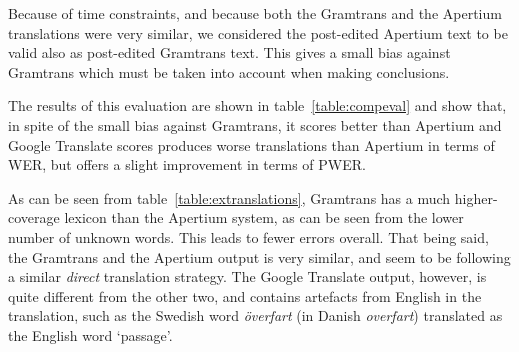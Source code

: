 \documentclass[11pt]{article}
\begin{document}
Because of time constraints, and because both the Gramtrans and the Apertium translations were very similar, 
we considered the post-edited Apertium text to be valid also as post-edited Gramtrans text.
This gives a small bias against Gramtrans which must be taken into account when making 
conclusions.

The results of this evaluation are shown in table~\ref{table:compeval} and show that, in spite 
of the small bias against Gramtrans, it scores better than Apertium and Google Translate 
scores produces worse translations than Apertium in terms of WER, but offers a slight improvement
in terms of PWER. 

As can be seen from table~\ref{table:extranslations}, Gramtrans has a much higher-coverage lexicon 
than the Apertium system, as can be seen from the lower number of unknown words. This leads to fewer errors overall. That being said, the Gramtrans
and the Apertium output is very similar, and seem to be following a similar \emph{direct} translation 
strategy. The Google Translate output, however, is quite different from the other two, and contains 
artefacts from English in the translation, such as the Swedish word \emph{överfart} (in Danish \emph{overfart}) translated as 
the English word `passage'.
 




\end{document}
